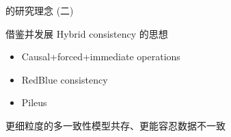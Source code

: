 \begin{frame}{\ideadt{}的研究理念 (二)}
  \begin{table}[]
	\centering
	\renewcommand\arraystretch{1.5}
  \end{table}

  \pause 

  \begin{description}
	\setlength{\itemsep}{5pt}
	\item[思想:] 借鉴并发展 Hybrid consistency 的思想
	\item[典型:] 
	  \begin{itemize}
		\item Causal+forced+immediate operations 
		\item RedBlue consistency 
		\item Pileus 
	  \end{itemize}
	  \pause
	\item[特点:] 更细粒度的多一致性模型共存、更能容忍数据不一致
  \end{description}
\end{frame}
